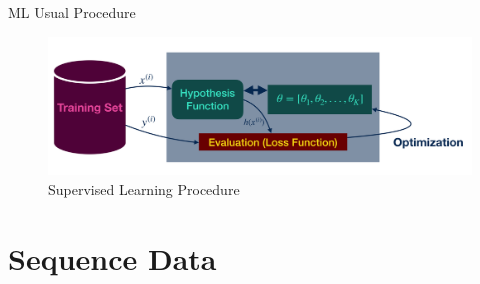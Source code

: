 \documentclass{beamer}
\begin{document}
	\begin{frame}{ML Usual Procedure}
		\begin{figure}
			\centering
			\caption{Supervised Learning Procedure}
			\includegraphics[scale=0.4]{Pics/supervised-learning.png}
		\end{figure}
	\end{frame}

\section{Sequence Data}
\end{document}
